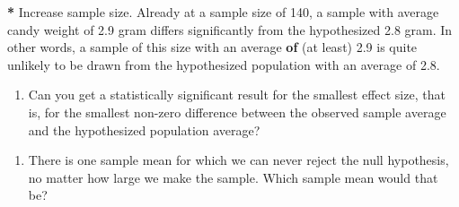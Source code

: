 \documentclass[a4paper]{book}
\newenvironment{Shaded}{\begin{snugshade}}{\end{snugshade}}
\newcommand{\KeywordTok}[1]{\textcolor[rgb]{0,0,0}{\textbf{#1}}}
\newcommand{\DecValTok}[1]{\textcolor[rgb]{0.00,0.00,0.00}{#1}}
\newcommand{\FloatTok}[1]{\textcolor[rgb]{0.00,0.00,0.00}{#1}}
\newcommand{\StringTok}[1]{\textcolor[rgb]{0.00,0.00,0.00}{#1}}
\newcommand{\ControlFlowTok}[1]{\textcolor[rgb]{0.00,0.00,0.00}{\textbf{#1}}}
\newcommand{\OperatorTok}[1]{\textcolor[rgb]{0.00,0.00,0.00}{\textbf{#1}}}
\newcommand{\NormalTok}[1]{#1}
\providecommand{\tightlist}{%
  \setlength{\itemsep}{0pt}\setlength{\parskip}{0pt}}
\theoremstyle{definition}
\theoremstyle{definition}
\theoremstyle{definition}
\theoremstyle{remark}
\begin{document}
\begin{Shaded}
\begin{Highlighting}[]
\OperatorTok{*}\StringTok{ }\NormalTok{Increase sample size. Already at a sample size of }\DecValTok{140}\NormalTok{, a sample with average}
\NormalTok{candy weight of }\FloatTok{2.9}\NormalTok{ gram differs significantly from the hypothesized }\FloatTok{2.8}\NormalTok{ gram.}
\NormalTok{In other words, a sample of this size with an average }\KeywordTok{of}\NormalTok{ (at least) }\FloatTok{2.9}\NormalTok{ is quite unlikely}
\NormalTok{to be drawn from the hypothesized population with an average of }\FloatTok{2.8}\NormalTok{.}
\end{Highlighting}
\end{Shaded}

\begin{enumerate}
\def\labelenumi{\arabic{enumi}.}
\setcounter{enumi}{2}
\tightlist
\item
  Can you get a statistically significant result for the smallest effect
  size, that is, for the smallest non-zero difference between the
  observed sample average and the hypothesized population average?
\end{enumerate}

\begin{Shaded}
\end{Shaded}

\begin{enumerate}
\def\labelenumi{\arabic{enumi}.}
\setcounter{enumi}{3}
\tightlist
\item
  There is one sample mean for which we can never reject the null
  hypothesis, no matter how large we make the sample. Which sample mean
  would that be?
\end{enumerate}
\end{document}

